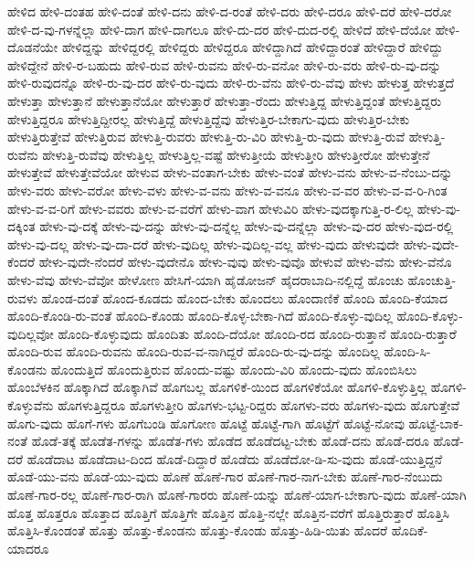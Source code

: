 {ಹೇಳಿದ
ಹೇಳಿ-ದಂತಹ
ಹೇಳಿ-ದಂತೆ
ಹೇಳಿ-ದನು
ಹೇಳಿ-ದ-ರಂತೆ
ಹೇಳಿ-ದರು
ಹೇಳಿ-ದರೂ
ಹೇಳಿ-ದರೆ
ಹೇಳಿ-ದರೋ
ಹೇಳಿ-ದ-ವು-ಗಳನ್ನೆಲ್ಲಾ
ಹೇಳಿ-ದಾಗ
ಹೇಳಿ-ದಾಗಲೂ
ಹೇಳಿ-ದು-ದರ
ಹೇಳಿ-ದುದ-ರಲ್ಲಿ
ಹೇಳಿದೆ
ಹೇಳಿ-ದೆಯೋ
ಹೇಳಿ-ದೊಡನೆಯೇ
ಹೇಳಿದ್ದನ್ನು
ಹೇಳಿದ್ದರಲ್ಲಿ
ಹೇಳಿದ್ದರು
ಹೇಳಿದ್ದರೂ
ಹೇಳಿದ್ದಾಗಿದೆ
ಹೇಳಿದ್ದಾರಂತೆ
ಹೇಳಿದ್ದಾರೆ
ಹೇಳಿದ್ದು
ಹೇಳಿದ್ದೇನೆ
ಹೇಳಿ-ರ-ಬಹುದು
ಹೇಳಿ-ರುವ
ಹೇಳಿ-ರುವನು
ಹೇಳಿ-ರು-ವನೋ
ಹೇಳಿ-ರು-ವರು
ಹೇಳಿ-ರು-ವು-ದನ್ನು
ಹೇಳಿ-ರುವುದನ್ನೊ
ಹೇಳಿ-ರು-ವು-ದರ
ಹೇಳಿ-ರು-ವುದು
ಹೇಳಿ-ರು-ವೆನು
ಹೇಳಿ-ರು-ವೆವು
ಹೇಳು
ಹೇಳುತ್ತ
ಹೇಳುತ್ತದೆ
ಹೇಳುತ್ತಾ
ಹೇಳುತ್ತಾನೆ
ಹೇಳುತ್ತಾನೆಯೋ
ಹೇಳುತ್ತಾರೆ
ಹೇಳುತ್ತಾ-ರೆಂದು
ಹೇಳುತ್ತಿದ್ದ
ಹೇಳುತ್ತಿದ್ದಂತೆ
ಹೇಳುತ್ತಿದ್ದರು
ಹೇಳುತ್ತಿದ್ದರೂ
ಹೇಳುತ್ತಿದ್ದೀರಲ್ಲ
ಹೇಳುತ್ತಿದ್ದೆ
ಹೇಳುತ್ತಿದ್ದೆವು
ಹೇಳುತ್ತಿರ-ಬೇಕಾಗು-ವುದು
ಹೇಳುತ್ತಿರ-ಬೇಕು
ಹೇಳುತ್ತಿರುತ್ತೇವೆ
ಹೇಳುತ್ತಿರುವ
ಹೇಳುತ್ತಿ-ರುವರು
ಹೇಳುತ್ತಿ-ರು-ವಿರಿ
ಹೇಳುತ್ತಿ-ರು-ವುದು
ಹೇಳುತ್ತಿ-ರುವೆ
ಹೇಳುತ್ತಿ-ರುವೆನು
ಹೇಳುತ್ತಿ-ರುವೆವು
ಹೇಳುತ್ತಿಲ್ಲ
ಹೇಳುತ್ತಿಲ್ಲ-ವಷ್ಟೆ
ಹೇಳುತ್ತೀಯೆ
ಹೇಳುತ್ತೀರಿ
ಹೇಳುತ್ತೀರೋ
ಹೇಳುತ್ತೇನೆ
ಹೇಳುತ್ತೇವೆ
ಹೇಳುತ್ತೇವೆಯೋ
ಹೇಳುವ
ಹೇಳು-ವಂತಾಗ-ಬೇಕು
ಹೇಳು-ವಂತೆ
ಹೇಳು-ವನು
ಹೇಳು-ವ-ನೆಂಬು-ದನ್ನು
ಹೇಳು-ವರು
ಹೇಳು-ವರೋ
ಹೇಳು-ವಳು
ಹೇಳು-ವ-ವನು
ಹೇಳು-ವ-ವನೂ
ಹೇಳು-ವ-ವರ
ಹೇಳು-ವ-ವ-ರಿ-ಗಿಂತ
ಹೇಳು-ವ-ವ-ರಿಗೆ
ಹೇಳು-ವವರು
ಹೇಳು-ವ-ವರೆಗೆ
ಹೇಳು-ವಾಗ
ಹೇಳುವಿರಿ
ಹೇಳು-ವುದಕ್ಕಾಗುತ್ತಿ-ರ-ಲಿಲ್ಲ
ಹೇಳು-ವು-ದಕ್ಕಿಂತ
ಹೇಳು-ವು-ದಕ್ಕೆ
ಹೇಳು-ವು-ದನ್ನು
ಹೇಳು-ವು-ದನ್ನೆಲ್ಲ
ಹೇಳು-ವು-ದನ್ನೆಲ್ಲಾ
ಹೇಳು-ವು-ದರ
ಹೇಳು-ವುದ-ರಲ್ಲಿ
ಹೇಳು-ವು-ದಲ್ಲ
ಹೇಳು-ವು-ದಾ-ದರೆ
ಹೇಳು-ವುದಿಲ್ಲ
ಹೇಳು-ವುದಿಲ್ಲ-ವಲ್ಲ
ಹೇಳು-ವುದು
ಹೇಳುವುದೇ
ಹೇಳು-ವುದೇ-ಕೆಂದರೆ
ಹೇಳು-ವುದೇ-ನೆಂದರೆ
ಹೇಳು-ವುದೇನೊ
ಹೇಳು-ವುವು
ಹೇಳು-ವುವೊ
ಹೇಳುವೆ
ಹೇಳು-ವೆನು
ಹೇಳು-ವೆನೊ
ಹೇಳು-ವೆವು
ಹೇಳು-ವೆವೋ
ಹೇಳೋಣ
ಹೇಸಿಗೆ-ಯಾಗಿ
ಹೈಡೋಜನ್
ಹೈದರಾಬಾದಿ-ನಲ್ಲಿದ್ದೆ
ಹೊಂಚು
ಹೊಂಚುತ್ತಿ-ರುವಳು
ಹೊಂಡ-ದಂತೆ
ಹೊಂದ-ಕೂಡದು
ಹೊಂದ-ಬೇಕು
ಹೊಂದಲು
ಹೊಂದಾಣಿಕೆ
ಹೊಂದಿ
ಹೊಂದಿ-ಕೆಯಾದ
ಹೊಂದಿ-ಕೊಂಡಿ-ರು-ವಂತೆ
ಹೊಂದಿ-ಕೊಂಡು
ಹೊಂದಿ-ಕೊಳ್ಳ-ಬೇಕಾ-ಗಿದೆ
ಹೊಂದಿ-ಕೊಳ್ಳು-ವುದಿಲ್ಲ
ಹೊಂದಿ-ಕೊಳ್ಳು-ವುದಿಲ್ಲವೋ
ಹೊಂದಿ-ಕೊಳ್ಳುವುದು
ಹೊಂದಿತು
ಹೊಂದಿ-ದೆಯೋ
ಹೊಂದಿ-ರದ
ಹೊಂದಿ-ರುತ್ತಾನೆ
ಹೊಂದಿ-ರುತ್ತಾರೆ
ಹೊಂದಿ-ರುವ
ಹೊಂದಿ-ರುವನು
ಹೊಂದಿ-ರುವ-ವ-ನಾಗಿದ್ದರೆ
ಹೊಂದಿ-ರು-ವು-ದನ್ನು
ಹೊಂದಿಲ್ಲ
ಹೊಂದಿ-ಸಿ-ಕೊಂಡನು
ಹೊಂದುತ್ತಿದೆ
ಹೊಂದುತ್ತಿರುವ
ಹೊಂದು-ವಷ್ಟು
ಹೊಂದು-ವಿರಿ
ಹೊಂದು-ವುದು
ಹೊಂಬಿಸಿಲು
ಹೊಂಬೆಳಕಿನ
ಹೊಕ್ಕಾಗಿದೆ
ಹೊಕ್ಕಾಗಿವೆ
ಹೊಗಬಲ್ಲ
ಹೊಗಳಿಕೆ-ಯಿಂದ
ಹೊಗಳಿಕೆಯೋ
ಹೊಗಳಿ-ಕೊಳ್ಳುತ್ತಿಲ್ಲ
ಹೊಗಳಿ-ಕೊಳ್ಳುವೆನು
ಹೊಗಳುತ್ತಿದ್ದರೂ
ಹೊಗಳುತ್ತೀರಿ
ಹೊಗಳು-ಭಟ್ಟ-ರಿದ್ದರು
ಹೊಗಳು-ವರು
ಹೊಗಳು-ವುದು
ಹೊಗುತ್ತೇವೆ
ಹೊಗು-ವುದು
ಹೊಗೆ-ಗಳು
ಹೊಗೆಬಂಡಿ
ಹೊಗೋಣ
ಹೊಟ್ಟೆ
ಹೊಟ್ಟೆ-ಗಾಗಿ
ಹೊಟ್ಟೆಗೆ
ಹೊಟ್ಟೆ-ನೋವು
ಹೊಟ್ಟೆ-ಬಾಕ-ನಂತೆ
ಹೊಡೆ-ತಕ್ಕೆ
ಹೊಡೆತ-ಗಳನ್ನು
ಹೊಡೆತ-ಗಳು
ಹೊಡೆದ
ಹೊಡೆದಟ್ಟ-ಬೇಕು
ಹೊಡೆ-ದನು
ಹೊಡೆ-ದರೂ
ಹೊಡೆ-ದರೆ
ಹೊಡೆದಾಟ
ಹೊಡೆದಾಟ-ದಿಂದ
ಹೊಡೆ-ದಿದ್ದಾರೆ
ಹೊಡೆದು
ಹೊಡೆದೋ-ಡಿ-ಸು-ವುದು
ಹೊಡೆ-ಯುತ್ತಿದ್ದನೆ
ಹೊಡೆ-ಯು-ವನು
ಹೊಡೆ-ಯು-ವುದು
ಹೊಣೆ
ಹೊಣೆ-ಗಾರ
ಹೊಣೆ-ಗಾರ-ನಾಗ-ಬೇಕು
ಹೊಣೆ-ಗಾರ-ನೆಂಬುದು
ಹೊಣೆ-ಗಾರ-ರಲ್ಲ
ಹೊಣೆ-ಗಾರ-ರಾಗಿ
ಹೊಣೆ-ಗಾರರು
ಹೊಣೆ-ಯನ್ನು
ಹೊಣೆ-ಯಾಗ-ಬೇಕಾಗು-ವುದು
ಹೊಣೆ-ಯಾಗಿ
ಹೊತ್ತ
ಹೊತ್ತರೂ
ಹೊತ್ತಾದ
ಹೊತ್ತಿಗೆ
ಹೊತ್ತಿಗೇ
ಹೊತ್ತಿನ
ಹೊತ್ತಿ-ನಲ್ಲೇ
ಹೊತ್ತಿನ-ವರೆಗೆ
ಹೊತ್ತಿರುತ್ತಾರೆ
ಹೊತ್ತಿಸಿ
ಹೊತ್ತಿಸಿ-ಕೊಂಡಂತೆ
ಹೊತ್ತು
ಹೊತ್ತು-ಕೊಂಡನು
ಹೊತ್ತು-ಕೊಂಡು
ಹೊತ್ತು-ಹಿಡಿ-ಯಿತು
ಹೊದರೆ
ಹೊದಿಕೆ-ಯಾದರೂ
}
